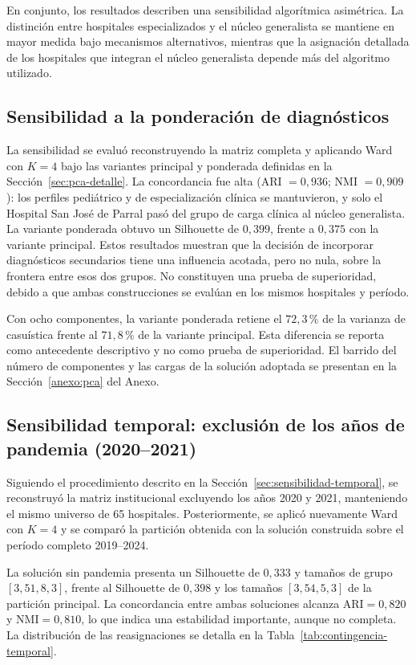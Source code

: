 En conjunto, los resultados describen una sensibilidad algorítmica asimétrica. La distinción entre hospitales especializados y el núcleo generalista se mantiene en mayor medida bajo mecanismos alternativos, mientras que la asignación detallada de los hospitales que integran el núcleo generalista depende más del algoritmo utilizado.

\subsection*{Sensibilidad a la ponderación de diagnósticos}
\label{sec:sensibilidad-diagnostica}

La sensibilidad se evaluó reconstruyendo la matriz completa y aplicando Ward
con $K=4$ bajo las variantes principal y ponderada definidas en la
Sección~\ref{sec:pca-detalle}. La concordancia fue alta (ARI $=0{,}936$;
NMI $=0{,}909$): los perfiles pediátrico y de especialización clínica se
mantuvieron, y solo el Hospital San José de Parral pasó del grupo de carga
clínica al núcleo generalista. La variante ponderada obtuvo un Silhouette de
$0{,}399$, frente a $0{,}375$ con la variante principal. Estos resultados
muestran que la decisión de incorporar diagnósticos secundarios tiene una
influencia acotada, pero no nula, sobre la frontera entre esos dos grupos. No
constituyen una prueba de superioridad, debido a que ambas construcciones se evalúan en
los mismos hospitales y período.

Con ocho componentes, la variante ponderada retiene el $72{,}3\,\%$ de la
varianza de casuística frente al $71{,}8\,\%$ de la variante principal. Esta
diferencia se reporta como antecedente descriptivo y no como prueba de
superioridad. El barrido del número de componentes y las cargas de la solución
adoptada se presentan en la Sección~\ref{anexo:pca} del Anexo.

\subsection*{Sensibilidad temporal: exclusión de los años de pandemia (2020--2021)}

Siguiendo el procedimiento descrito en la Sección~\ref{sec:sensibilidad-temporal}, se reconstruyó la matriz institucional excluyendo los años 2020 y 2021, manteniendo el mismo universo de 65 hospitales. Posteriormente, se aplicó nuevamente Ward con $K=4$ y se comparó la partición obtenida con la solución construida sobre el período completo 2019--2024.

La solución sin pandemia presenta un Silhouette de $0{,}333$ y tamaños de grupo $[3,51,8,3]$, frente al Silhouette de $0{,}398$ y los tamaños $[3,54,5,3]$ de la partición principal. La concordancia entre ambas soluciones alcanza $\text{ARI}=0{,}820$ y $\text{NMI}=0{,}810$, lo que indica una estabilidad importante, aunque no completa. La distribución de las reasignaciones se detalla en la Tabla~\ref{tab:contingencia-temporal}.

